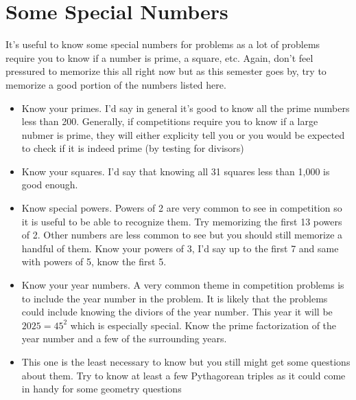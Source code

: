 \documentclass[11pt]{article}
\begin{document}
\section{Some Special Numbers}
It's useful to know some special numbers for problems as a lot of problems require you to know if a number is prime, a square, etc. Again, don't feel pressured to memorize this all right now
but as this semester goes by, try to memorize a good portion of the numbers listed here.
\begin{itemize}
    \item Know your primes. I'd say in general it's good to know all the prime numbers less than 200. Generally, if competitions require you to know
        if a large nubmer is prime, they will either explicity tell you or you would be expected to check if it is indeed prime (by testing for divisors) 
    \item Know your squares. I'd say that knowing all 31 squares less than 1,000 is good enough.
    \item Know special powers. Powers of 2 are very common to see in competition so it is useful to be able to recognize them. Try memorizing the first 13 powers of 2. Other numbers are less common to see but you should still
        memorize a handful of them. Know your powers of 3, I'd say up to the first 7 and same with powers of 5, know the first 5.
    \item Know your year numbers. A very common theme in competition problems is to include the year number in the problem. It is likely that 
    the problems could include knowing the diviors of the year number. This year it will be $2025=45^2$ which is especially special. Know the prime factorization of the year number and a few of the surrounding years.
    \item This one is the least necessary to know but you still might get some questions about them. Try to know at least a few Pythagorean triples as it could come in handy for some geometry questions
\end{itemize} 
\end{document}
